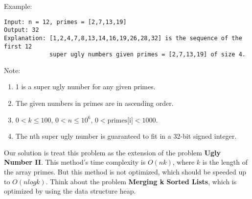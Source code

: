 \documentclass[11pt]{article}
\begin{document}
Example:
\begin{verbatim}
Input: n = 12, primes = [2,7,13,19]
Output: 32 
Explanation: [1,2,4,7,8,13,14,16,19,26,28,32] is the sequence of the first 12 
             super ugly numbers given primes = [2,7,13,19] of size 4.
\end{verbatim}
Note:
\begin{enumerate}
	\item 1 is a super ugly number for any given primes.
	\item The given numbers in primes are in ascending order.
	\item $0 < k \leq 100$, $0 < n \leq 10^6$, $0 < \text{primes[i]} < 1000$.
	\item The nth super ugly number is guaranteed to fit in a 32-bit signed integer.
\end{enumerate}

Our solution is treat this problem as the extension of the problem \textbf{Ugly Number II}. 
This method's time complexity is $O(nk)$, where $k$ is the length of the array primes. 
But this method is not optimized, which should be speeded up to $O(n log k)$. 
Think about the problem \textbf{Merging k Sorted Lists}, which is optimized by using the data structure heap. 

\inputminted[breaklines=true,frame=leftline, linenos=true]{python}{src/nthSuperUglyNumber.py}
\end{document}

